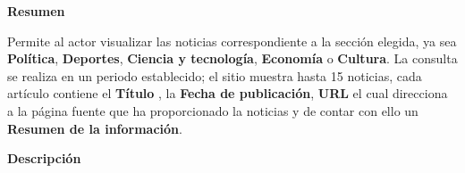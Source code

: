 

\begin{large}
	\textbf{Resumen}\\
\end{large}

Permite al actor visualizar las noticias correspondiente a la sección elegida,
ya sea \textbf{Política}, \textbf{Deportes}, \textbf{Ciencia y tecnología}, \textbf{Economía}
o \textbf{Cultura}. La consulta se realiza en un periodo establecido; el sitio muestra hasta 15
 noticias, cada artículo contiene el \textbf{Título} , la \textbf{Fecha de publicación}, \textbf{URL} el cual direcciona a la página fuente que ha proporcionado la noticias y de contar con ello  un
\textbf{Resumen de la información}.\\

\begin{large}
	\textbf{Descripción}\\
\end{large}



